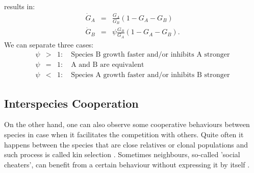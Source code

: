 \documentclass[10pt,A4paper]{article}
\begin{document}
results in: 
\begin{eqnarray}
\dot{G}_A &=&\frac{G_A}{G_B}\left(1 - G_A-G_B\right )\\
\dot{G}_B &=&\psi\frac{G_B}{G_A}\left(1-G_A-G_B\right ). 
\end{eqnarray}
We can separate three cases: 
\begin{eqnarray}
\psi&>&1:\quad\text{Species B growth faster and/or inhibits A stronger}\\
\psi&=&1:\quad\text{A and B are equivalent}\\
\psi&<&1:\quad\text{Species A growth faster and/or inhibits B stronger}
\end{eqnarray}

\subsection{Interspecies Cooperation}

On the other hand, one can also observe some cooperative behaviours between species in case when it facilitates the competition with others.
Quite often it happens between the species that are close relatives or clonal populations and such process is called kin selection \cite{west_social_2007}.
Sometimes neighbours, so-called 'social cheaters', can benefit from a certain behaviour without expressing it by itself \cite{rainey_evolution_2003}.


\end{document}
